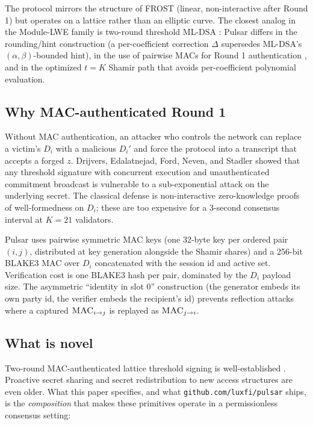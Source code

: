 The protocol mirrors the structure of FROST \cite{frost} (linear, non-interactive after Round 1) but operates on a lattice rather than an elliptic curve. The closest analog in the Module-LWE family is two-round threshold ML-DSA \cite{dilithium,dttf2024}: Pulsar differs in the rounding/hint construction (a per-coefficient correction $\Delta$ supersedes ML-DSA's $(\alpha,\beta)$-bounded hint), in the use of pairwise MACs for Round 1 authentication \cite{drijvers2019}, and in the optimized $t=K$ Shamir path \cite{lp077} that avoids per-coefficient polynomial evaluation.

\subsection{Why MAC-authenticated Round 1}

Without MAC authentication, an attacker who controls the network can replace a victim's $D_i$ with a malicious $D_i'$ and force the protocol into a transcript that accepts a forged $z$. Drijvers, Edalatnejad, Ford, Neven, and Stadler \cite{drijvers2019} showed that any threshold signature with concurrent execution and unauthenticated commitment broadcast is vulnerable to a sub-exponential attack on the underlying secret. The classical defense is non-interactive zero-knowledge proofs of well-formedness on $D_i$; these are too expensive for a 3-second consensus interval at $K{=}21$ validators.

Pulsar uses pairwise symmetric MAC keys (one 32-byte key per ordered pair $(i,j)$, distributed at key generation alongside the Shamir shares) and a 256-bit BLAKE3 \cite{blake3} MAC over $D_i$ concatenated with the session id and active set. Verification cost is one BLAKE3 hash per pair, dominated by the $D_i$ payload size. The asymmetric ``identity in slot 0'' construction (the generator embeds its own party id, the verifier embeds the recipient's id) prevents reflection attacks where a captured $\textsc{MAC}_{i \to j}$ is replayed as $\textsc{MAC}_{j \to i}$.

\subsection{What is novel}

Two-round MAC-authenticated lattice threshold signing is well-established \cite{ringtail,thresholdraccoon,hermine}. Proactive secret sharing \cite{hjky97} and secret redistribution to new access structures \cite{desmedtjajodia97} are even older. What this paper specifies, and what \texttt{github.com/luxfi/pulsar} ships, is the \emph{composition} that makes these primitives operate in a permissionless consensus setting:


